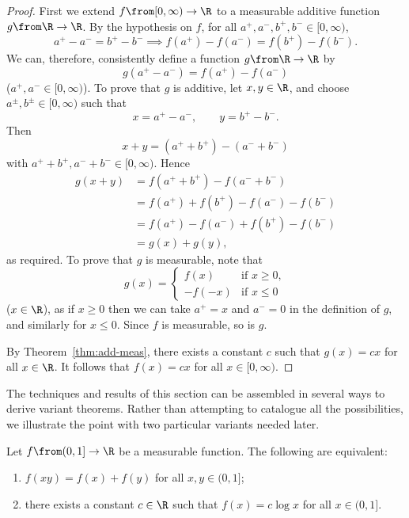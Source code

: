 \begin{proof}
First we extend $f \from [0, \infty) \to \R$ to a measurable additive
  function $g \from \R \to \R$.  By the hypothesis on $f$, for all
  $a^+, a^-, b^+, b^- \in [0, \infty)$,
\[
a^+ - a^- = b^+ - b^-
\implies
f(a^+) - f(a^-) = f(b^+) - f(b^-).
\]
We can, therefore, consistently define a function $g \from \R \to \R$ by
\[
g(a^+ - a^-) = f(a^+) - f(a^-)
\]
($a^+, a^- \in [0, \infty)$).  To prove that $g$ is additive, let $x, y \in
  \R$, and choose $a^\pm, b^\pm \in [0, \infty)$ such that
\[
x = a^+ - a^-,
\qquad
y = b^+ - b^-.
\]
Then 
\[
x + y = (a^+ + b^+) - (a^- + b^-)
\]
with $a^+ + b^+, a^- + b^- \in [0, \infty)$.  Hence
% 
\begin{align*}
g(x + y)        &
=
f(a^+ + b^+) - f(a^- + b^-)     \\
&
=
f(a^+) + f(b^+) - f(a^-) - f(b^-)       \\
&
=
f(a^+) - f(a^-) + f(b^+) - f(b^-)       \\
&
=
g(x) + g(y),
\end{align*}
% 
as required.  To prove that $g$ is measurable, note that
\[
g(x) 
=
\begin{cases}
f(x)    &\text{if } x \geq 0,   \\
-f(-x)  &\text{if } x \leq 0
\end{cases}
\]
($x \in \R$), as if $x \geq 0$ then we can take $a^+ = x$ and $a^- = 0$
in the definition of $g$, and similarly for $x \leq 0$.  Since $f$ is
measurable, so is $g$.

By Theorem~\ref{thm:add-meas}, there exists a constant $c$ such that
$g(x) = cx$ for all $x \in \R$.  It follows that $f(x) = cx$ for all
$x \in [0, \infty)$.
\end{proof}

The techniques and results of this section can be assembled in several ways
to derive variant theorems.  Rather than attempting to catalogue all the
possibilities, we illustrate the point with two particular variants needed
later.

\begin{cor}
Let $f \from (0, 1] \to \R$ be a measurable function.  The following are
equivalent:
% 
\begin{enumerate}
\item 
{}
$f(xy) = f(x) + f(y)$ for all $x, y \in (0, 1]$;

\item
{}
there exists a constant $c \in \R$ such that $f(x) = c\log x$ for all $x
\in (0, 1]$.  
\end{enumerate}
\end{cor}

